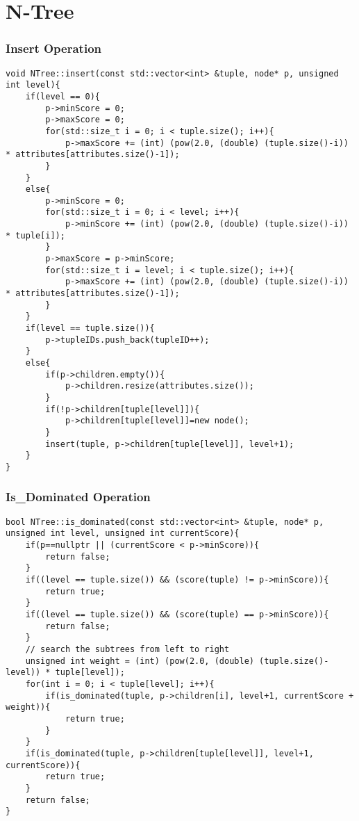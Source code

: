 \section{N-Tree}

\subsubsection{{\large Insert Operation}}
\begin{verbatim}
void NTree::insert(const std::vector<int> &tuple, node* p, unsigned int level){
	if(level == 0){
		p->minScore = 0;
		p->maxScore = 0;
		for(std::size_t i = 0; i < tuple.size(); i++){
			p->maxScore += (int) (pow(2.0, (double) (tuple.size()-i)) * attributes[attributes.size()-1]);
		}
	}
	else{
		p->minScore = 0;
		for(std::size_t i = 0; i < level; i++){
			p->minScore += (int) (pow(2.0, (double) (tuple.size()-i)) * tuple[i]);
		}
		p->maxScore = p->minScore;
		for(std::size_t i = level; i < tuple.size(); i++){
			p->maxScore += (int) (pow(2.0, (double) (tuple.size()-i)) * attributes[attributes.size()-1]);
		}
	}
	if(level == tuple.size()){
		p->tupleIDs.push_back(tupleID++);
	}
	else{
		if(p->children.empty()){
			p->children.resize(attributes.size());
		}
		if(!p->children[tuple[level]]){
			p->children[tuple[level]]=new node();
		}
		insert(tuple, p->children[tuple[level]], level+1);
	}
}
\end{verbatim}

\subsubsection{{\large Is\_Dominated Operation}}
\begin{verbatim}
bool NTree::is_dominated(const std::vector<int> &tuple, node* p, unsigned int level, unsigned int currentScore){
	if(p==nullptr || (currentScore < p->minScore)){
		return false;
	}
	if((level == tuple.size()) && (score(tuple) != p->minScore)){
		return true;
	}
	if((level == tuple.size()) && (score(tuple) == p->minScore)){
		return false;
	}
	// search the subtrees from left to right
	unsigned int weight = (int) (pow(2.0, (double) (tuple.size()-level)) * tuple[level]);
	for(int i = 0; i < tuple[level]; i++){
		if(is_dominated(tuple, p->children[i], level+1, currentScore + weight)){
			return true;
		}
	}
	if(is_dominated(tuple, p->children[tuple[level]], level+1, currentScore)){
		return true;
	}
	return false;
}
\end{verbatim}

